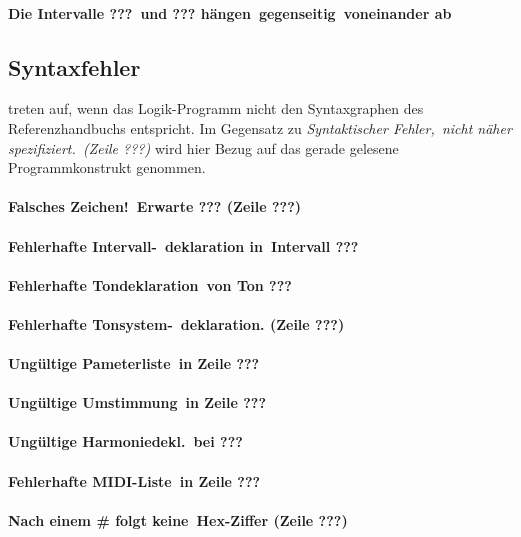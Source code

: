 \paragraph{Die Intervalle ???\ und ??? hängen\ gegenseitig\ voneinander ab}
	 
\subsection{Syntaxfehler}\label{sec:syntaxfehler}
treten auf, wenn das Logik-Programm nicht den Syntaxgraphen des
Referenzhandbuchs entspricht.  Im Gegensatz zu \emph{Syntaktischer
  Fehler,\ nicht näher spezifiziert.\ (Zeile ???)} wird
hier Bezug auf das gerade gelesene Programmkonstrukt genommen.
\paragraph{Falsches Zeichen!\ Erwarte ??? (Zeile ???)}
\paragraph{Fehlerhafte Intervall-\ deklaration in\ Intervall ???}
\paragraph{Fehlerhafte Tondeklaration\ von Ton ???}
\paragraph{Fehlerhafte Tonsystem-\ deklaration. (Zeile ???)}
\paragraph{Ungültige Pameterliste\ in Zeile ???}
\paragraph{Ungültige Umstimmung\ in Zeile ???}
\paragraph{Ungültige Harmoniedekl.\ bei ???}
\paragraph{Fehlerhafte MIDI-Liste\ in Zeile ???}
\paragraph{Nach einem \protect\# folgt keine\ Hex-Ziffer (Zeile ???)}


